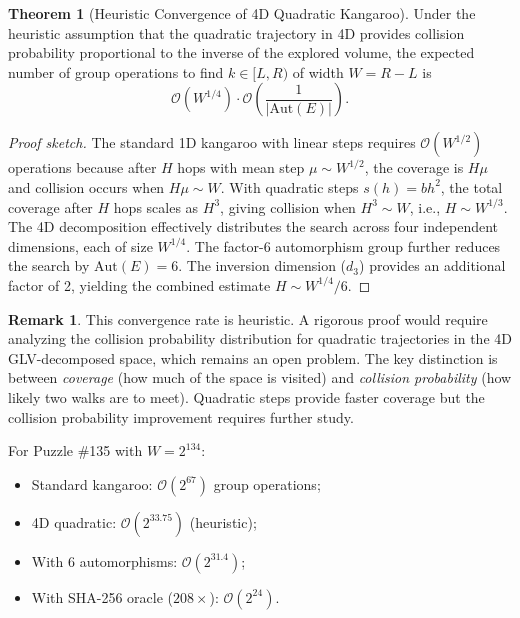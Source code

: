 \documentclass[11pt,a4paper]{article}
\theoremstyle{definition}
\newtheorem{theorem}{Theorem}[section]
\newtheorem{remark}{Remark}[section]
\newcommand{\bigO}{\mathcal{O}}
\begin{document}
\begin{theorem}[Heuristic Convergence of 4D Quadratic Kangaroo]
Under the heuristic assumption that the quadratic trajectory in 4D provides collision probability proportional to the inverse of the explored volume, the expected number of group operations to find $k \in [L, R)$ of width $W = R - L$ is
\begin{equation}
\bigO\left(W^{1/4}\right) \cdot \bigO\left(\frac{1}{|\mathrm{Aut}(E)|}\right).
\end{equation}
\end{theorem}

\begin{proof}[Proof sketch]
The standard 1D kangaroo with linear steps requires $\bigO(W^{1/2})$ operations because after $H$ hops with mean step $\mu \sim W^{1/2}$, the coverage is $H\mu$ and collision occurs when $H\mu \sim W$. With quadratic steps $s(h) = bh^2$, the total coverage after $H$ hops scales as $H^3$, giving collision when $H^3 \sim W$, i.e., $H \sim W^{1/3}$. The 4D decomposition effectively distributes the search across four independent dimensions, each of size $W^{1/4}$. The factor-6 automorphism group further reduces the search by $\mathrm{Aut}(E) = 6$. The inversion dimension ($d_3$) provides an additional factor of 2, yielding the combined estimate $H \sim W^{1/4}/6$.
\end{proof}

\begin{remark}
This convergence rate is heuristic. A rigorous proof would require analyzing the collision probability distribution for quadratic trajectories in the 4D GLV-decomposed space, which remains an open problem. The key distinction is between \textit{coverage} (how much of the space is visited) and \textit{collision probability} (how likely two walks are to meet). Quadratic steps provide faster coverage but the collision probability improvement requires further study.
\end{remark}

For Puzzle \#135 with $W = 2^{134}$:
\begin{itemize}
\item Standard kangaroo: $\bigO(2^{67})$ group operations;
\item 4D quadratic: $\bigO(2^{33.75})$ (heuristic);
\item With 6 automorphisms: $\bigO(2^{31.4})$;
\item With SHA-256 oracle ($208\times$): $\bigO(2^{24})$.
\end{itemize}
\end{document}
